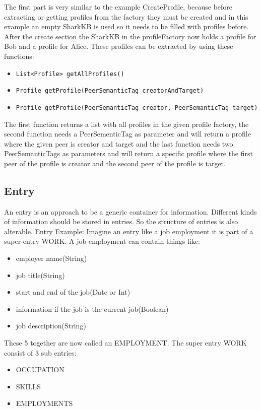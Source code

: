 \documentclass[12pt]{article}
\begin{document}
The first part is very similar to the example CreateProfile, because before extracting or getting profiles from the factory they must be created and in this example an empty SharkKB is used so it needs to be filled with profiles before. After the create section the SharkKB in the profileFactory now holds a profile for Bob and a profile for Alice. These profiles can be extracted by using these functions:
\begin{itemize}
  \item {\tt List<Profile> getAllProfiles()}
  \item {\tt Profile getProfile(PeerSemanticTag creatorAndTarget)} 
  \item {\tt  Profile getProfile(PeerSemanticTag creator, PeerSemanticTag target)}
\end{itemize}
The first function returns a list with all profiles in the given profile factory, the second function needs a PeerSementicTag as parameter and will return a profile where the given peer is creator and target and the last function needs two PeerSemanticTags as parameters and will return a specific profile where the first peer of the profile is creator and the second peer of the profile is target.

\subsection{Entry}
An entry is an approach to be a generic container for information. Different kinds of information should be stored in entries. So the structure of entries is also alterable. 
Entry Example: Imagine an entry like a job employment it is part of a super entry WORK. A job employment can contain things like:
\begin{itemize}
  \item employer name(String)
  \item job title(String)
  \item start and end of the job(Date or Int)
  \item information if the job is the current job(Boolean)
  \item job description(String)
\end{itemize}

These 5 together are now called an EMPLOYMENT. The super entry WORK consist of 3 sub entries:
\begin{itemize}
  \item OCCUPATION
  \item SKILLS
  \item EMPLOYMENTS
\end{itemize}
\end{document}
